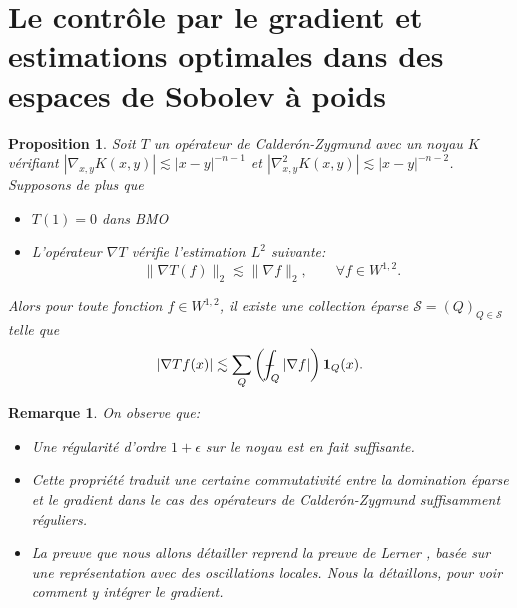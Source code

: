 \documentclass[11pt]{amsart}
\newtheorem{proposition}[theorem]{Proposition}
\newtheorem*{remark}{Remarque}
\newcommand{\mcS}{{\mathcal S}}
\def\Xint#1{\mathchoice
   {\XXint\displaystyle\textstyle{#1}}%
   {\XXint\textstyle\scriptstyle{#1}}%
   {\XXint\scriptstyle\scriptscriptstyle{#1}}%
   {\XXint\scriptscriptstyle\scriptscriptstyle{#1}}%
   \!\int}
\def\XXint#1#2#3{{\setbox0=\hbox{$#1{#2#3}{\int}$}
     \vcenter{\hbox{$#2#3$}}\kern-.5\wd0}}
\def\aver#1{\Xint-_{#1}}
\begin{document}
\section{Le contr\^ole par le gradient et estimations optimales dans des espaces de Sobolev \`a poids} \label{sec:gradient}

\begin{proposition} 
Soit $T$ un op\'erateur de Calder\'on-Zygmund avec un noyau $K$ v\'erifiant $|\nabla_{x,y} K(x,y)| \lesssim |x-y|^{-n-1}$ et $|\nabla^2_{x,y} K(x,y)| \lesssim |x-y|^{-n-2}$. Supposons de plus que
\begin{itemize}
\item[$\bullet$] $T(1)=0$ dans BMO
\item[$\bullet$] L'op\'erateur $\nabla T$ v\'erifie l'estimation $L^2$ suivante:
$$  \| \nabla T(f)\|_2 \lesssim \|\nabla f\|_2, \qquad  \forall f\in W^{1,2}.$$
\end{itemize}
Alors pour toute fonction $f\in W^{1,2}$, il existe une collection \'eparse $\mcS=(Q)_{Q\in \mcS}$ telle que
$$ |\nabla Tf(x)| \lesssim \sum_{Q} \left(\aver{Q} \left|\nabla f\right| \right) {\bf 1}_Q(x).$$
\end{proposition}

\begin{remark} On observe que:
\begin{itemize}
\item[$\bullet$] Une r\'egularit\'e d'ordre $1+\epsilon$ sur le noyau est en fait suffisante.
\item[$\bullet$] Cette propri\'et\'e traduit une certaine commutativit\'e entre la domination \'eparse et le gradient dans le cas des op\'erateurs de Calder\'on-Zygmund suffisamment r\'eguliers.
\item[$\bullet$] La preuve que nous allons d\'etailler reprend la preuve de Lerner \cite{Lerner-simplerA_2}, bas\'ee sur une repr\'esentation avec des oscillations locales. Nous la d\'etaillons, pour voir comment y int\'egrer le gradient.
\end{itemize}
\end{remark}
\end{document}
